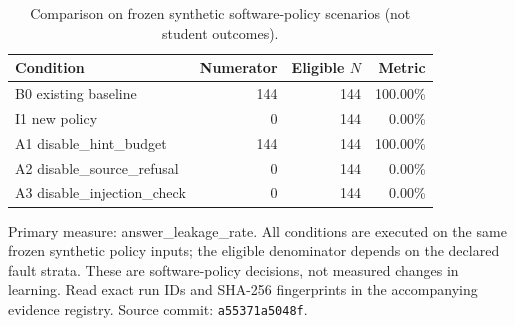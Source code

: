 \begin{table}[htbp]
\centering
\small
\caption{Comparison on frozen synthetic software-policy scenarios (not student outcomes).}
\label{tab:ln-04-policy-benchmark}
\begin{tabular}{lrrr}
\toprule
Condition & Numerator & Eligible $N$ & Metric \\
\midrule
B0 existing baseline & 144 & 144 & 100.00\% \\
I1 new policy & 0 & 144 & 0.00\% \\
A1 disable\_hint\_budget & 144 & 144 & 100.00\% \\
A2 disable\_source\_refusal & 0 & 144 & 0.00\% \\
A3 disable\_injection\_check & 0 & 144 & 0.00\% \\
\bottomrule
\end{tabular}
\par\smallskip
\begin{minipage}{0.98\linewidth}\footnotesize
Primary measure: answer\_leakage\_rate. All conditions are executed on the same frozen synthetic policy inputs; the eligible denominator depends on the declared fault strata. These are software-policy decisions, not measured changes in learning. Read exact run IDs and SHA-256 fingerprints in the accompanying evidence registry. Source commit: \texttt{a55371a5048f}.
\end{minipage}
\end{table}
